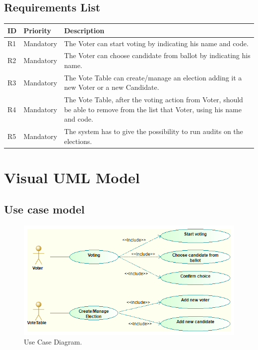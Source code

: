 \documentclass{article}
\begin{document}
\subsection{Requirements List}

\begin{center}
    \begin{tabular}{ | l | l  | p{9cm} |}
    \hline
    ID	& Priority & Description \\ \hline
    R1 &	Mandatory&	The Voter can start voting by indicating his name and code. \\ \hline
   R2& Mandatory&The Voter can choose candidate from ballot by indicating his name.\\ \hline
    R3	&Mandatory&	The Vote Table can create/manage an election adding it a new Voter or a new Candidate. \\ \hline
  R4&Mandatory&The Vote Table, after the voting action from Voter, should be able to remove from the list that Voter, using his name and code.  \\ \hline
  R5 & Mandatory & The system has to give the possibility to run audits on the elections. \\\hline
    \end{tabular}
\end{center}

\section{Visual UML Model}
\subsection{Use case model}

\begin{figure}[H]
\centering
	\includegraphics[width=\textwidth,height=\textheight,keepaspectratio]{use.png}
	\caption{Use Case Diagram.}
	\label{fig:PropProf}
\end{figure}
\end{document}
